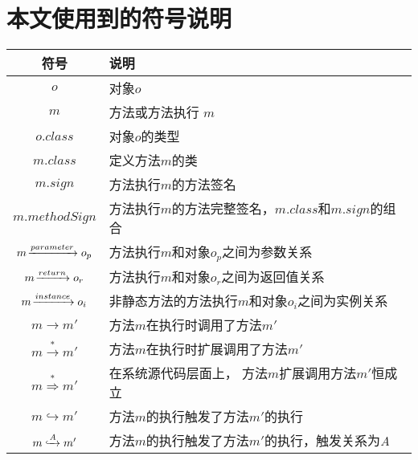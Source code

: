 




\chapter*{本文使用到的符号说明}




\begin{table*}[!ht]
\centering

\begin{tabular}{|c|p{11cm}|}
\hline
符号&说明\\
\hline
$o$ & 对象$o$\\
\hline
$m$ & 方法或方法执行 $m$\\
\hline	
$o.class$ &对象$o$的类型 \\ 
\hline	
$m.class$ & 定义方法$m$的类 \\
\hline	
$m.sign$ & 方法执行$m$的方法签名 \\
\hline	
 $m.methodSign$  &方法执行$m$的方法完整签名，$m.class$和$m.sign$的组合 \\
\hline	
 $m \joinrel\xrightarrow{parameter} o_p$  &  方法执行$m$和对象$o_p$之间为参数关系  \\
\hline 
$m \joinrel\xrightarrow{return} o_r$& 方法执行$m$和对象$o_r$之间为返回值关系  \\
\hline
$m \joinrel\xrightarrow{instance} o_i$&   非静态方法的方法执行$m$和对象$o_i$之间为实例关系\\
\hline
$m \to m'$ & 方法$m$在执行时调用了方法$m'$\\
\hline
$m \stackrel{\ast}{\to} m' $ &  方法$m$在执行时扩展调用了方法$m'$\\
\hline
$m  \stackrel{\ast}{ \Rightarrow } m'$ &在系统源代码层面上， 方法$m$扩展调用方法$m'$恒成立 \\
\hline
$m \hookrightarrow m'$ & 方法$m$的执行触发了方法$m'$的执行 \\
\hline					
$m \lhook\joinrel\xrightarrow{\text{\textit{A}}}  m' $& 方法$m$的执行触发了方法$m'$的执行，触发关系为\textit{A}\\
\hline
\end{tabular}
\end{table*}





